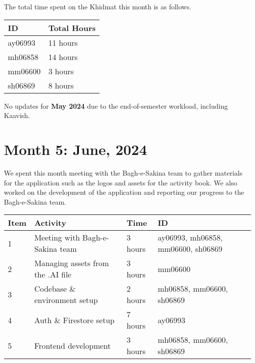 \documentclass{article}
\begin{document}
\vspace{1em}

\noindent The total time spent on the Khidmat this month is as follows.

\vspace{1em}

\noindent \begin{tabular}{|l|l|} \hline
  ID & Total Hours \\ \hline
  ay06993 & 11 hours \\ \hline
  mh06858 & 14 hours \\ \hline
  mm06600 & 3 hours \\ \hline
  sh06869 & 8 hours \\ \hline
\end{tabular}

\newpage %
\noindent * No updates for \textbf{May 2024} due to the end-of-semester workload, including Kaavish.
\section*{Month 5: June, 2024}

We spent this month meeting with the Bagh-e-Sakina team to gather materials for the application such as the logos and assets for the activity book. We also worked on the development of the application and reporting our progress to the Bagh-e-Sakina team. 

\vspace{1em}

\noindent \begin{tabular}{|l|l|l|l|}
  \hline
  Item & Activity & Time   & ID \\ \hline
  1 & Meeting with Bagh-e-Sakina team & 3 hours & ay06993, mh06858, mm06600, sh06869 \\ \hline
  2 & Managing assets from the .AI file & 3 hours & mm06600 \\ \hline
  3 & Codebase \& environment setup & 2 hours  & mh06858, mm06600, sh06869 \\ \hline
  4 & Auth \& Firestore setup & 7 hours & ay06993 \\ \hline
  5 & Frontend development & 3 hours & mh06858, mm06600, sh06869 \\ \hline
\end{tabular}

\vspace{1em}
\end{document}
